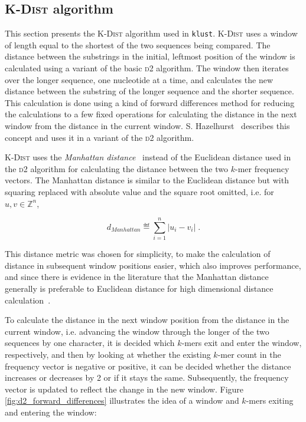 \subsection{\textsc{K-Dist} algorithm}

This section presents the \textsc{K-Dist} algorithm used in \texttt{klust}.
\textsc{K-Dist} uses a window of length equal to the shortest of the two
sequences being compared. The distance between the substrings in the initial,
leftmost position of the window is calculated using a variant of the basic
\textsc{d2} algorithm. The window then iterates over the longer sequence, one
nucleotide at a time, and calculates the new distance between the substring of
the longer sequence and the shorter sequence.  This calculation is done using a
kind of forward differences method for reducing the calculations to a few fixed
operations for calculating the distance in the next window from the distance in
the current window. S. Hazelhurst~\cite{hazelhurst} describes this concept and
uses it in a variant of the \textsc{d2} algorithm.

\textsc{K-Dist} uses the \emph{Manhattan distance}~\cite{upton} instead of the
Euclidean distance used in the \textsc{d2} algorithm for calculating the
distance between the two $k$-mer frequency vectors. The Manhattan distance is
similar to the Euclidean distance but with squaring replaced with absolute
value and the square root omitted, i.e.  for $u, v \in \mathbb{Z}^n$,

\begin{equation*}
  d_{Manhattan} \eqdef \sum_{i=1}^{n} |u_i - v_i| \;.
\end{equation*}

This distance metric was chosen for simplicity, to make the calculation of
distance in subsequent window positions easier, which also improves
performance, and since there is evidence in the literature that the Manhattan
distance generally is preferable to Euclidean distance for high dimensional
distance calculation~\cite{aggarwal}.

To calculate the distance in the next window position from the distance in the
current window, i.e. advancing the window through the longer of the two
sequences by one character, it is decided which $k$-mers exit and enter the
window, respectively, and then by looking at whether the existing $k$-mer count
in the frequency vector is negative or positive, it can be decided whether the
distance increases or decreases by 2 or if it stays the same.
Subsequently, the frequency vector is updated to reflect the change in the new
window. Figure \ref{fig:d2_forward_differences} illustrates the idea of a
window and $k$-mers exiting and entering the window:

